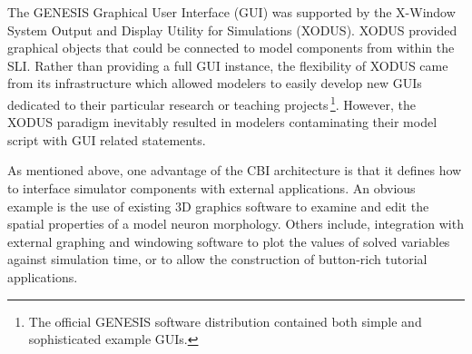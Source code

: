 \documentclass[10pt]{article}
\begin{document}
The GENESIS Graphical User Interface (GUI) was supported by the
X-Window System Output and Display Utility for Simulations (XODUS).
XODUS provided graphical objects that could be
connected to model components from within the SLI.  Rather than
providing a full GUI instance, the flexibility of XODUS came from its
infrastructure which allowed modelers to easily develop new GUIs
dedicated to their particular research or teaching projects\,\footnote{The
  official GENESIS software distribution contained both simple and
  sophisticated example GUIs.}.  However, the XODUS paradigm
inevitably resulted in modelers contaminating their model script with GUI
related statements.

As mentioned above, one advantage of the CBI architecture is that it defines how to interface simulator components
with external applications.  An obvious example is the use of existing
3D graphics software to examine and edit the spatial properties of a
model neuron morphology.  Others include, integration with external
graphing and windowing software to plot the values of solved
variables against simulation time, or to allow the construction of
button-rich tutorial applications.
\end{document}
